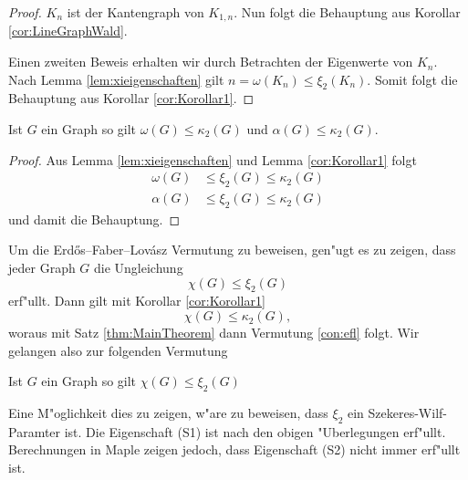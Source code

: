   \begin{proof}
    $K_n$ ist der Kantengraph von $K_{1,n}$. Nun folgt die Behauptung aus Korollar \ref{cor:LineGraphWald}.

    Einen zweiten Beweis erhalten wir durch Betrachten der Eigenwerte von $K_n$. Nach Lemma \ref{lem:xieigenschaften} gilt $n = \omega(K_n) \leq \xi_{2}(K_n)$. Somit folgt die Behauptung aus Korollar \ref{cor:Korollar1}.
  \end{proof}

  \begin{corollary}
    Ist $G$ ein Graph so gilt $\omega\left( G \right)\leq \kappa_{2}\left( G \right)$ und $\alpha\left( G \right)\leq \kappa_{2}\left( G \right)$.
    \label{cor:alphaomegakrausz}
  \end{corollary}

  \begin{proof}
    Aus Lemma \ref{lem:xieigenschaften} und Lemma \ref{cor:Korollar1} folgt
    \begin{align*}
      \omega(G) &\leq \xi_{2}(G) \leq \kappa_{2}(G) \\
      \alpha(G) &\leq \xi_{2}(G) \leq \kappa_{2}(G) 
    \end{align*}
    und damit die Behauptung.
  \end{proof}

  Um die Erd\H{o}s--Faber--Lov\'asz Vermutung zu beweisen, gen"ugt es zu zeigen, dass jeder Graph $G$ die Ungleichung $$\chi(G) \leq \xi_{2}(G)$$ erf"ullt. Dann gilt mit Korollar \ref{cor:Korollar1} $$\chi(G) \leq \kappa_{2}(G),$$  woraus mit Satz \ref{thm:MainTheorem} dann Vermutung \ref{con:efl} folgt. Wir gelangen also zur folgenden Vermutung
  \begin{conjecture}
    Ist $G$ ein Graph so gilt $\chi(G) \leq \xi_{2}(G)$
    \label{con:maincon}
  \end{conjecture}

  Eine M"oglichkeit dies zu zeigen, w"are zu beweisen, dass $\xi_2$ ein Szekeres-Wilf-Paramter ist. Die Eigenschaft (S1) ist nach den obigen "Uberlegungen erf"ullt. Berechnungen in Maple zeigen jedoch, dass Eigenschaft (S2) nicht immer erf"ullt ist. 

